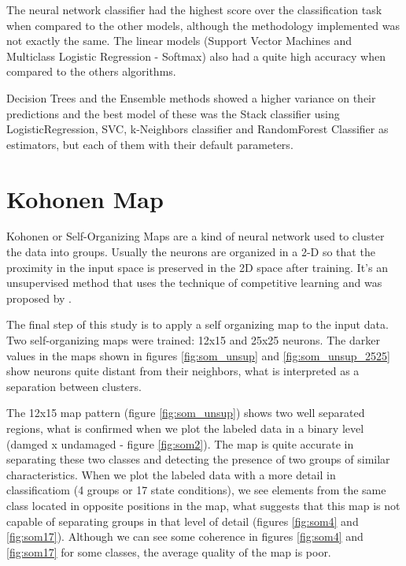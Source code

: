 \documentclass[twocolumn]{article}
\begin{document}
The neural network classifier had the highest score over the classification task when compared to the other models, although the methodology implemented was not exactly the same. The linear models (Support Vector Machines and Multiclass Logistic Regression - Softmax) also had a quite high accuracy when compared to the others algorithms.

Decision Trees and the Ensemble methods showed a higher variance on their predictions and the best model of these was the Stack classifier using LogisticRegression, SVC, k-Neighbors classifier and RandomForest Classifier as estimators, but each of them with their default parameters.


\section{Kohonen Map}

Kohonen or Self-Organizing Maps are a kind of neural network used to cluster the data into groups. Usually the neurons are organized in a 2-D so that the proximity in the input space is preserved in the 2D space after training. It's an unsupervised method that uses the technique of competitive learning and was proposed by \cite{kohonen}.

The final step of this study is to apply a self organizing map to the input data. Two self-organizing maps were trained: 12x15 and 25x25 neurons. The darker values in the maps shown in figures \ref{fig:som_unsup} and \ref{fig:som_unsup_2525} show neurons quite distant from their neighbors, what is interpreted as a separation between clusters.

The 12x15 map pattern (figure \ref{fig:som_unsup}) shows two well separated regions, what is confirmed when we plot the labeled data in a binary level (damged x undamaged - figure \ref{fig:som2}). The map is quite accurate in separating these two classes and detecting the presence of two groups of similar characteristics. When we plot the labeled data with a more detail in classificatiom (4 groups or 17 state conditions), we see elements from the same class located in opposite positions in the map, what suggests that this map is not capable of separating groups in that level of detail (figures \ref{fig:som4} and \ref{fig:som17}). Although we can see some coherence in figures \ref{fig:som4} and \ref{fig:som17} for some classes, the average quality of the map is poor.
\end{document}
